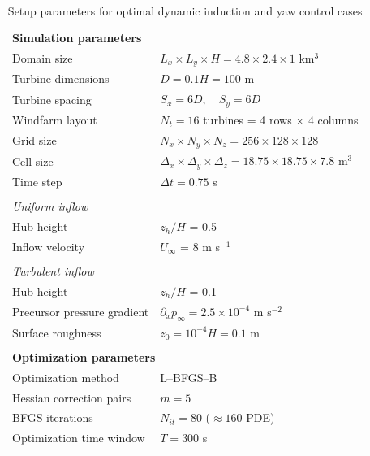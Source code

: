 \begin{table}
	\caption{Setup parameters for optimal dynamic induction and yaw control cases \label{tab:case_definition}}
	\begin{tabular}{llccc}
		\hline 
		\multicolumn{5}{l}{\textbf{Simulation parameters}}\\
		Domain size  			& \multicolumn{4}{l}{$L_x \times L_y \times H = 4.8 \times 2.4 \times 1$ km$^3$}  \\ 
		Turbine dimensions  		& \multicolumn{4}{l}{$D = 0.1H = 100$ m}\\ 
		Turbine spacing  		& \multicolumn{4}{l}{$S_x = 6D, \quad S_y = 6D$}\\
		Windfarm layout 		& \multicolumn{4}{l}{$N_t = 16 $ turbines = 4 rows $\times$ 4 columns} \\ 
		Grid size 			& \multicolumn{4}{l}{$N_x \times N_y \times N_z = 256 \times 128 \times 128$}\\
		Cell size 			& \multicolumn{4}{l}{$\Delta_x \times \Delta_y \times \Delta_z = 18.75 \times 18.75 \times 7.8$ m$^3$}\\
		Time step 			& \multicolumn{4}{l}{$\Delta t = 0.75$ s}\\		
		& & & & \\	
		\multicolumn{5}{l}{\textit{Uniform inflow}}\\
		Hub height & \multicolumn{4}{l}{$z_h/H$ = 0.5}\\
		Inflow velocity & \multicolumn{4}{l}{$U_\infty$ = 8 m s$^{-1}$}\\
		& & & & \\			
		\multicolumn{5}{l}{\textit{Turbulent inflow}}\\
		Hub height & \multicolumn{4}{l}{$z_h/H$ = 0.1}\\		
		Precursor pressure gradient  	& \multicolumn{4}{l}{$ \partial_x p_\infty = 2.5 \times 10^{-4}$ m s$^{-2}$}  \\ 
		Surface roughness  &  \multicolumn{4}{l}{$z_0 = 10^{-4}H = 0.1$ m}\\ 		
		& & & & \\	
		\multicolumn{5}{l}{\textbf{Optimization parameters}}\\
		Optimization method		& \multicolumn{4}{l}{L--BFGS--B} \\
		Hessian correction pairs	& \multicolumn{4}{l}{$m = 5$} \\
		BFGS iterations 		& \multicolumn{4}{l}{$N_{it} = 80$ ($\approx 160$ PDE)} \\
		Optimization time window	& \multicolumn{4}{l}{$T = 300$ s}\\

\end{tabular}
\end{table}
